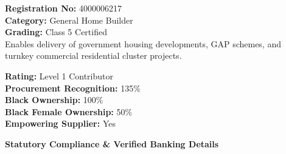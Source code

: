 \hfill
\begin{minipage}[t]{0.34\textwidth}
    \begin{tcolorbox}[
        enhanced, colback=white, colframe=mhlightgray, boxrule=0.8pt, arc=4pt,
        title={\bfseries\color{white}\faBuilding\ NHBRC Registration},
        colbacktitle=mhnavy, fonttitle=\bfseries\small,
        left=7pt, right=7pt, top=6pt, bottom=6pt,
        drop shadow=black!4
    ]
        {\fontsize{7.8pt}{10.8pt}\selectfont\color{mhtext}
        \textbf{Registration No:} 4000006217\\
        \textbf{Category:} General Home Builder\\
        \textbf{Grading:} Class 5 Certified\\
        Enables delivery of government housing developments, GAP schemes, and turnkey commercial residential cluster projects.
        }
    \end{tcolorbox}

    \vspace{0.20cm}

    \begin{tcolorbox}[
        enhanced, colback=mhoffwhite, colframe=mhnavy, boxrule=0.8pt, arc=4pt,
        title={\bfseries\color{white}\faAward\ B-BBEE Credentials},
        colbacktitle=mhnavy, fonttitle=\bfseries\small,
        left=7pt, right=7pt, top=6pt, bottom=6pt,
        drop shadow=black!4
    ]
        {\fontsize{7.8pt}{10.8pt}\selectfont\color{mhtext}
        \textbf{Rating:} Level 1 Contributor\\
        \textbf{Procurement Recognition:} 135\%\\
        \textbf{Black Ownership:} 100\%\\
        \textbf{Black Female Ownership:} 50\%\\
        \textbf{Empowering Supplier:} Yes
        }
    \end{tcolorbox}
\end{minipage}

\vfill

{\large\bfseries\color{mhnavy} Statutory Compliance \& Verified Banking Details}
\vspace{0.08cm}

